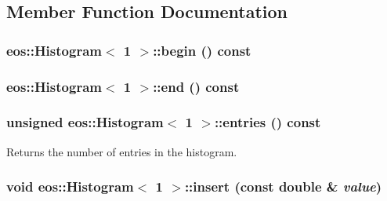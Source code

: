 \subsection{Member Function Documentation}
\hypertarget{classeos_1_1Histogram_3_011_01_4_a76e195e3ddf0422c9fa0d898f422b49b}{
\subsubsection[{begin}]{ eos::Histogram$<$ 1 $>$::begin () const}}
\label{classeos_1_1Histogram_3_011_01_4_a76e195e3ddf0422c9fa0d898f422b49b}
\hypertarget{classeos_1_1Histogram_3_011_01_4_a973197d530ad51adc4f09bce519a5add}{
\subsubsection[{end}]{ eos::Histogram$<$ 1 $>$::end () const}}
\label{classeos_1_1Histogram_3_011_01_4_a973197d530ad51adc4f09bce519a5add}
\hypertarget{classeos_1_1Histogram_3_011_01_4_aa3aebb76fd88285eb49739901a5f9174}{
\subsubsection[{entries}]{\setlength{\rightskip}{0pt plus 5cm}unsigned eos::Histogram$<$ 1 $>$::entries () const}}
\label{classeos_1_1Histogram_3_011_01_4_aa3aebb76fd88285eb49739901a5f9174}


Returns the number of entries in the histogram. \hypertarget{classeos_1_1Histogram_3_011_01_4_a640dfd992be8cc9d16b8635a739ffaad}{
\subsubsection[{insert}]{\setlength{\rightskip}{0pt plus 5cm}void eos::Histogram$<$ 1 $>$::insert (const double \& {\em value})}}
\label{classeos_1_1Histogram_3_011_01_4_a640dfd992be8cc9d16b8635a739ffaad}


